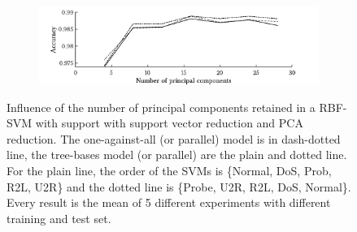 \begin{figure}[h!]
        \begin{subfigure}[b]{.97\textwidth}  
            \centering 
            \includegraphics[width=.98\textwidth]{parts/chap-4/img-svm/nl-pca/acc.png}
        \end{subfigure}
        \caption[Comparison of different PCA-RBFSVM models.]{Influence of the number of principal components retained in a RBF-SVM with support with support vector reduction and PCA reduction. The one-against-all (or parallel) model is in dash-dotted line, the tree-bases model (or parallel) are the plain and dotted line. For the plain line, the order of the SVMs is \{Normal, DoS, Prob, R2L, U2R\} and the dotted line is \{Probe, U2R, R2L, DoS, Normal\}. Every result is the mean of 5 different experiments with different training and test set.}
        \label{fig:svm-nl-pca}
\end{figure}

